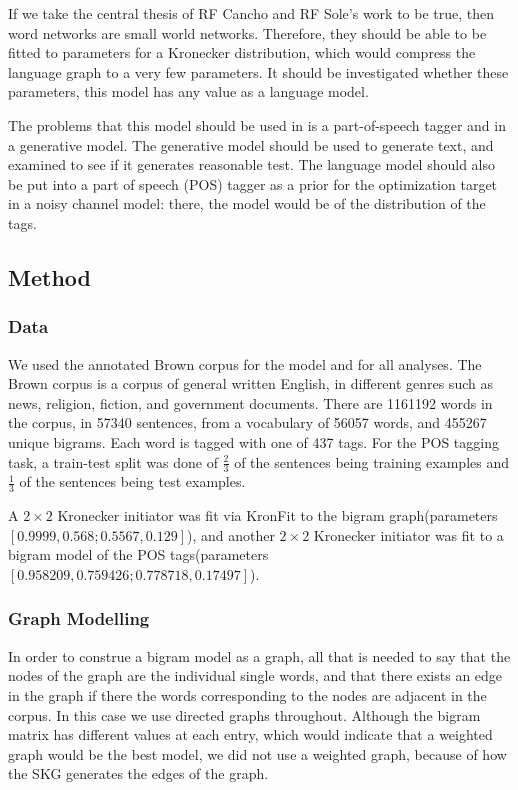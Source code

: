 \documentclass[12pt]{article}
\begin{document}
If we take the central thesis of RF Cancho and RF Sole's work to be true, then word networks are small world networks. Therefore, they should be able to be fitted to parameters for a Kronecker distribution, which would compress the language graph to a very few parameters. It should be investigated whether these parameters, this model has any value as a language model.

The problems that this model should be used in is a part-of-speech tagger and in a generative model. The generative model should be used to generate text, and examined to see if it generates reasonable test. The language model should also be put into a part of speech (POS) tagger as a prior for the optimization target in a noisy channel model: there, the model would be of the distribution of the tags. \cite{collins}

\subsection*{Method}

\subsubsection*{Data}
We used the annotated Brown corpus for the model and for all analyses. The Brown corpus is a corpus of general written English, in different genres such as news, religion, fiction, and government documents. There are 1161192 words in the corpus, in 57340 sentences, from a vocabulary of 56057 words, and 455267 unique bigrams. Each word is tagged with one of 437 tags. For the POS tagging task, a train-test split was done of $\frac{2}{3}$ of the sentences being training examples and $\frac{1}{3}$ of the sentences being test examples. %

A $2 \times 2$ Kronecker initiator was fit via KronFit to the bigram graph(parameters $[ 0.9999, 0.568; 0.5567, 0.129 ]$), and another $2 \times 2$ Kronecker initiator was fit to a bigram model of the POS tags(parameters $[0.958209, 0.759426; 0.778718, 0.17497]$).

\subsubsection*{Graph Modelling}
In order to construe a bigram model as a graph, all that is needed to say that the nodes of the graph are the individual single words, and that there exists an edge in the graph if there the words corresponding to the nodes are adjacent in the corpus. In this case we use directed graphs throughout. Although the bigram matrix has different values at each entry, which would indicate that a weighted graph would be the best model, we did not use a weighted graph, because of how the SKG generates the edges of the graph.
\end{document}
